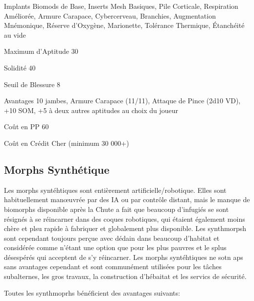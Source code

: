 \begin{description*} \item[Implants] Biomods de Base, Inserts Mesh Basiques, Pile Corticale, Respiration Améliorée, Armure Carapace, Cybercerveau, Branchies, Augmentation Mnémonique, Réserve d'Oxygène, Marionette, Tolérance Thermique, Étanchéité au vide \item[Maximum d'Aptitude] 30 \item[Solidité] 40 \item[Seuil de Blessure] 8 \item[Avantages] 10 jambes, Armure Carapace (11/11), Attaque de Pince (2d10 VD), +10 SOM, +5 à deux autres aptitudes au choix du joueur\item[Coût en PP] 60 \item[Coût en Crédit] Cher (minimum 30 000+) \end{description*} 

\subsection{Morphs Synthétique} \label{sec:starting-syntheticmorphs} 

Les morphs syntéhtiques sont entièrement artificielle/robotique. Elles sont habituellement manœuvrée par des IA ou par contrôle distant, mais le manque de biomorphs disponible après la Chute a fait que beaucoup d'infugiés se sont résignés à se réincarner dans des coques robotiques, qui étaient également moins chère et plsu rapide à fabriquer et globalement plus disponible. Les synthmorpsh sont cependant toujours perçue avec dédain dans beaucoup d'habitat et considérée comme n'étant une option que pour les plus pauvres et le splus désespérés qui acceptent de s'y réincarner. Les morphs syntéhtiques ne sotn aps sans avantages cependant et sont communément utilisées pour les tâches subalternes, les gros travaux, la construction d'hébaitat et les servics de sécurité. 

Toutes les synthmoprhs bénéficient des avantages suivants: 

